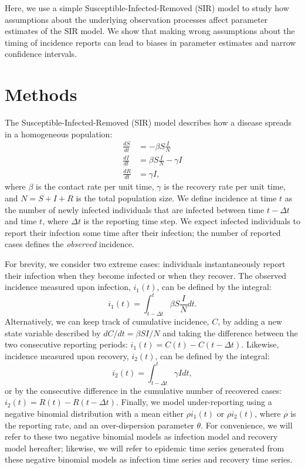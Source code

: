 \documentclass{article}\usepackage[]{graphicx}\usepackage[]{color}
\begin{document}
Here, we use a simple Susceptible-Infected-Removed (SIR) model to study how 
assumptions about the underlying observation processes affect parameter estimates
of the SIR model. We show that making wrong assumptions about the timing of 
incidence reports can lead to biases in parameter estimates and narrow 
confidence intervals. 

\section{Methods}

The Susceptible-Infected-Removed (SIR) model describes how a disease spreads in a
homogeneous population:
\begin{equation}
\begin{aligned}
\frac{dS}{dt} &= - \beta S \frac{I}{N}\\
\frac{dI}{dt} &= \beta S \frac{I}{N} - \gamma I\\
\frac{dR}{dt} &= \gamma I,
\end{aligned}
\end{equation}
where $\beta$ is the contact rate per unit time, $\gamma$ is the recovery rate per unit time, 
and $N = S + I + R$ is the total population size. 
We define incidence at time $t$ as the number of newly infected
individuals that are infected between time $t- \Delta t$ and time $t$, where $\Delta t$ is
the reporting time step. We expect infected individuals to report their infection some time
after their infection; the number of reported cases defines the \emph{observed} incidence. 

For brevity, we consider two extreme cases: individuals instantaneously report
their infection when they become infected or when they recover. The observed incidence 
measured upon infection, $i_1(t)$, can be defined by the integral:
\begin{equation}
i_1(t) = \int_{t - \Delta t}^{t} \beta S \frac{I}{N} dt.
\end{equation}
Alternatively, we can keep track of cumulative incidence, $C$, by adding a 
new state variable described by $dC/dt = \beta S I/N$ and taking the difference between 
the two consecutive reporting periods: $i_1(t) = C(t) - C(t-\Delta t)$. Likewise, 
incidence measured upon recovery, $i_2(t)$, can be defined by the integral:
\begin{equation}
i_2(t) = \int_{t-\Delta t}^{t} \gamma I dt,
\end{equation}
or by the consecutive difference in the cumulative number of recovered cases:
$i_2(t) = R(t) - R(t - \Delta t)$.
Finally, we model under-reporting using a negative binomial distribution with a
mean either $\rho i_1(t)$ or $\rho i_2(t)$, where $\rho$ is the reporting rate, and
an over-dispersion parameter $\theta$. For convenience, we will refer to these two
negative binomial models as infection model and recovery model hereafter; 
likewise, we will refer to epidemic time series generated from these
negative binomial models 
as infection time series and recovery time series.
\end{document}
